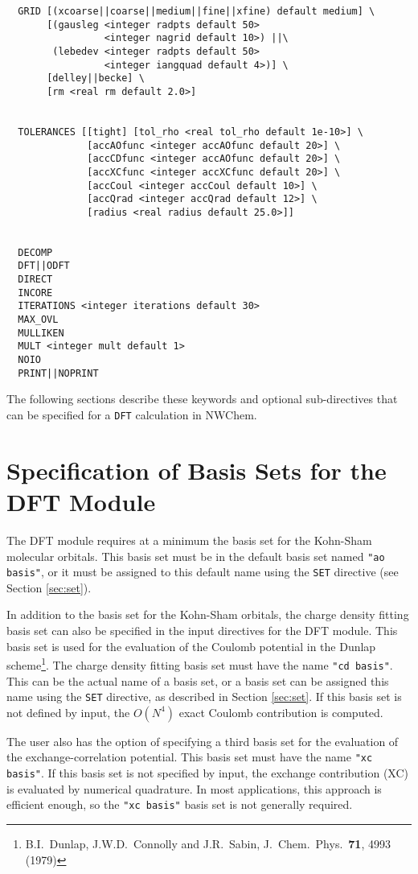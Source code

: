 \begin{verbatim}
  GRID [(xcoarse||coarse||medium||fine||xfine) default medium] \
       [(gausleg <integer radpts default 50> 
                 <integer nagrid default 10>) ||\ 
        (lebedev <integer radpts default 50> 
                 <integer iangquad default 4>)] \ 
       [delley||becke] \
       [rm <real rm default 2.0>]
        

  TOLERANCES [[tight] [tol_rho <real tol_rho default 1e-10>] \
              [accAOfunc <integer accAOfunc default 20>] \
              [accCDfunc <integer accAOfunc default 20>] \
              [accXCfunc <integer accXCfunc default 20>] \
              [accCoul <integer accCoul default 10>] \
              [accQrad <integer accQrad default 12>] \
              [radius <real radius default 25.0>]]


  DECOMP
  DFT||ODFT
  DIRECT
  INCORE
  ITERATIONS <integer iterations default 30>
  MAX_OVL
  MULLIKEN
  MULT <integer mult default 1>
  NOIO
  PRINT||NOPRINT
\end{verbatim}

The following 
sections describe these keywords and
optional sub-directives that can be specified for a \verb+DFT+ calculation
in NWChem.

\section{Specification of Basis Sets for the DFT Module}

The DFT module requires at a minimum the basis set for the Kohn-Sham 
molecular orbitals.  This basis set must be in the default basis set named
{\tt "ao basis"}, or it must be assigned to this default name using the
\verb+SET+ directive (see Section \ref{sec:set}).

In addition to the basis set for the Kohn-Sham orbitals, 
the charge density fitting basis set can also be specified in the 
input directives for the DFT module.  This basis set is used for the 
evaluation of the Coulomb potential in the Dunlap scheme\footnote{B.I.~Dunlap, 
J.W.D.~Connolly and J.R.~Sabin, J.~Chem.~Phys.~{\bf 71},  4993 (1979)}.
The charge density fitting basis set must have the name {\tt "cd basis"}.
This can be the actual name of a basis set, or a basis set can be 
assigned this name using the \verb+SET+ directive, as described in
Section \ref{sec:set}.  If this basis set is not defined by input,
the $O(N^4)$ exact Coulomb contribution is computed.

The user also has the option of specifying a third basis set for the 
evaluation of the exchange-correlation potential.  This basis set must
have the name {\tt "xc basis"}.  If this basis set is not specified
by input, the exchange contribution (XC) is evaluated by numerical
quadrature.  In most applications, this approach is efficient enough,
so the {\tt "xc basis"} basis set is not generally required.

